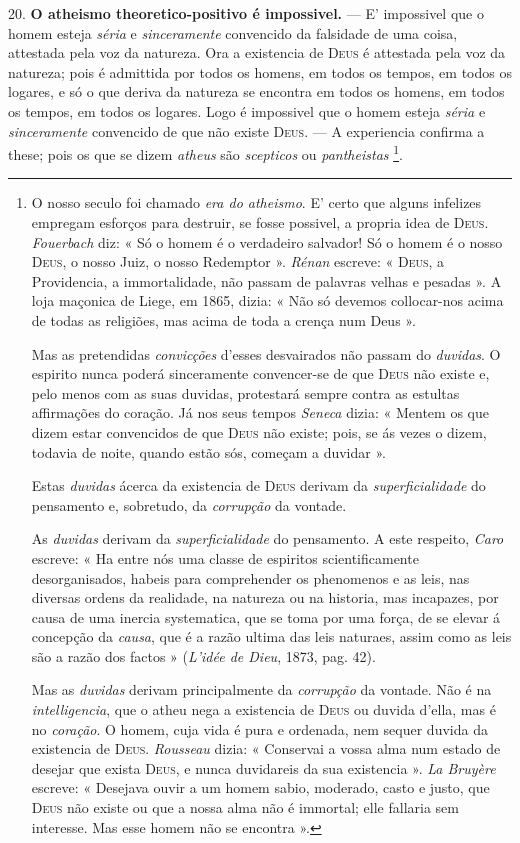 20. \textbf{O atheismo theoretico-positivo é impossivel.} --- E' impossivel que o homem esteja \emph{séria} e \emph{sinceramente} convencido da falsidade de uma coisa, attestada pela voz da natureza. Ora a existencia de \textsc{Deus} é attestada pela voz da natureza; pois é admittida por todos os homens, em todos os tempos, em todos os logares, e só o que deriva da natureza se encontra em todos os homens, em todos os tempos, em todos os logares. Logo é impossivel que o homem esteja \emph{séria} e \emph{sinceramente} convencido de que não existe \textsc{Deus}. --- A experiencia confirma a these; pois os que se dizem \emph{atheus} são \emph{scepticos} ou \emph{pantheistas} \footnote{O nosso seculo foi chamado \emph{era do atheismo}. E' certo que alguns infelizes empregam esforços para destruir, se fosse possivel, a propria idea de \textsc{Deus}. \emph{Fouerbach} diz: « Só o homem é o verdadeiro salvador! Só o homem é o nosso \textsc{Deus}, o nosso Juiz, o nosso Redemptor ». \emph{Rénan} escreve: « \textsc{Deus}, a Providencia, a immortalidade, não passam de palavras velhas e pesadas ». A loja maçonica de Liege, em 1865, dizia: « Não só devemos collocar-nos acima de todas as religiões, mas acima de toda a crença num Deus ».\par Mas as pretendidas \emph{convicções} d'esses desvairados não passam do \emph{duvidas}. O espirito nunca poderá sinceramente convencer-se de que \textsc{Deus} não existe e, pelo menos com as suas duvidas, protestará sempre contra as estultas affirmações do coração. Já nos seus tempos \emph{Seneca} dizia: « Mentem os que dizem estar convencidos de que \textsc{Deus} não existe; pois, se ás vezes o dizem, todavia de noite, quando estão sós, começam a duvidar ».\par Estas \emph{duvidas} ácerca da existencia de \textsc{Deus} derivam da \emph{superficialidade} do pensamento e, sobretudo, da \emph{corrupção} da vontade.\par As \emph{duvidas} derivam da \emph{superficialidade} do pensamento. A este respeito, \emph{Caro} escreve: « Ha entre nós uma classe de espiritos scientificamente desorganisados, habeis para comprehender os phenomenos e as leis, nas diversas ordens da realidade, na natureza ou na historia, mas incapazes, por causa de uma inercia systematica, que se toma por uma força, de se elevar á concepção da \emph{causa}, que é a razão ultima das leis naturaes, assim como as leis são a razão dos factos » (\emph{L'idée de Dieu}, 1873, pag. 42).\par Mas as \emph{duvidas} derivam principalmente da \emph{corrupção} da vontade. Não é na \emph{intelligencia}, que o atheu nega a existencia de \textsc{Deus} ou duvida d'ella, mas é no \emph{coração}. O homem, cuja vida é pura e ordenada, nem sequer duvida da existencia de \textsc{Deus}. \emph{Rousseau} dizia: « Conservai a vossa alma num estado de desejar que exista \textsc{Deus}, e nunca duvidareis da sua existencia ». \emph{La Bruyère} escreve: « Desejava ouvir a um homem sabio, moderado, casto e justo, que \textsc{Deus} não existe ou que a nossa alma não é immortal; elle fallaria sem interesse. Mas esse homem não se encontra ».}.

